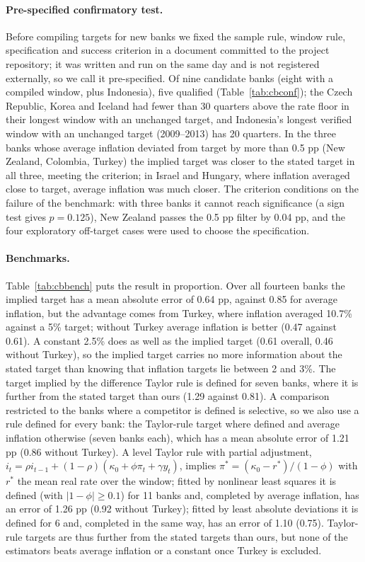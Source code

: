 \documentclass[pdflatex,sn-basic]{sn-jnl}
\theoremstyle{thmstyleone}\newtheorem{proposition}{Proposition}\newtheorem{theorem}{Theorem}
\theoremstyle{thmstylethree}\newtheorem{remark}{Remark}
\begin{document}
\paragraph{Pre-specified confirmatory test.} Before compiling targets for new banks we fixed the sample rule, window rule, specification and success criterion in a document committed to the project repository; it was written and run on the same day and is not registered externally, so we call it pre-specified. Of nine candidate banks (eight with a compiled window, plus Indonesia), five qualified (Table~\ref{tab:cbconf}); the Czech Republic, Korea and Iceland had fewer than 30 quarters above the rate floor in their longest window with an unchanged target, and Indonesia's longest verified window with an unchanged target (2009--2013) has 20 quarters. In the three banks whose average inflation deviated from target by more than 0.5 pp (New Zealand, Colombia, Turkey) the implied target was closer to the stated target in all three, meeting the criterion; in Israel and Hungary, where inflation averaged close to target, average inflation was much closer. The criterion conditions on the failure of the benchmark: with three banks it cannot reach significance (a sign test gives $p=0.125$), New Zealand passes the 0.5 pp filter by 0.04 pp, and the four exploratory off-target cases were used to choose the specification.

\paragraph{Benchmarks.} Table~\ref{tab:cbbench} puts the result in proportion. Over all fourteen banks the implied target has a mean absolute error of 0.64 pp, against 0.85 for average inflation, but the advantage comes from Turkey, where inflation averaged 10.7\% against a 5\% target; without Turkey average inflation is better (0.47 against 0.61). A constant 2.5\% does as well as the implied target (0.61 overall, 0.46 without Turkey), so the implied target carries no more information about the stated target than knowing that inflation targets lie between 2 and 3\%. The target implied by the difference Taylor rule is defined for seven banks, where it is further from the stated target than ours (1.29 against 0.81). A comparison restricted to the banks where a competitor is defined is selective, so we also use a rule defined for every bank: the Taylor-rule target where defined and average inflation otherwise (seven banks each), which has a mean absolute error of 1.21 pp (0.86 without Turkey). A level Taylor rule with partial adjustment, $i_t=\rho i_{t-1}+(1-\rho)(\kappa_0+\phi\pi_t+\gamma y_t)$, implies $\pi^*=(\kappa_0-r^*)/(1-\phi)$ with $r^*$ the mean real rate over the window; fitted by nonlinear least squares it is defined (with $|1-\phi|\ge0.1$) for 11 banks and, completed by average inflation, has an error of 1.26 pp (0.92 without Turkey); fitted by least absolute deviations it is defined for 6 and, completed in the same way, has an error of 1.10 (0.75). Taylor-rule targets are thus further from the stated targets than ours, but none of the estimators beats average inflation or a constant once Turkey is excluded.
\end{document}
